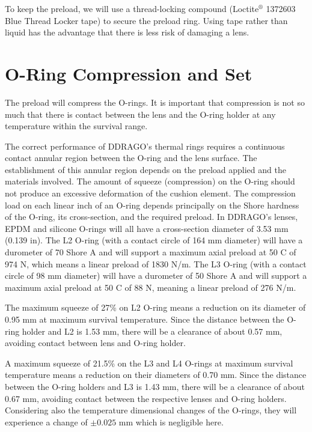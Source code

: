 \documentclass{report}
\begin{document}
To keep the preload, we will use a thread-locking compound (Loctite${}^\circledR $ 1372603 Blue Thread Locker tape) to secure the preload ring. Using tape rather than liquid has the advantage that there is less risk of damaging a lens.

\section{O-Ring Compression and Set}

The preload will compress the O-rings. It is important that compression is not so much that there is contact between the lens and the O-ring holder at any temperature within the survival range.

The correct performance of DDRAGO’s thermal rings requires a continuous contact annular region between the O-ring and the lens surface. The establishment of this annular region depends on the preload applied and the materials involved. The amount of squeeze (compression) on the O-ring should not produce an excessive deformation of the cushion element. The compression load on each linear inch of an O-ring depends principally on the Shore hardness of the O-ring, its cross-section, and the required preload. In DDRAGO’s lenses, EPDM and silicone O-rings will all have a cross-section diameter of 3.53 mm (0.139 in). The L2 O-ring (with a contact circle of 164 mm diameter) will have a durometer of 70 Shore A and will support a maximum axial preload at 50 C of 974 N, which means a linear preload of 1830 N/m. The L3 O-ring (with a contact circle of 98 mm diameter) will have a durometer of 50 Shore A and will support a maximum axial preload at 50 C of 88 N, meaning a linear preload of 276 N/m.

The maximum squeeze of 27\% on L2 O-ring means a reduction on its diameter of 0.95 mm at maximum survival temperature. Since the distance between the O-ring holder and L2 is 1.53 mm, there will be a clearance of about 0.57 mm, avoiding contact between lens and O-ring holder.

A maximum squeeze of 21.5\% on the L3 and L4 O-rings at maximum survival temperature means a reduction on their diameters of 0.70 mm. Since the distance between the O-ring holders and L3 is 1.43 mm, there will be a clearance of about 0.67 mm, avoiding contact between the respective lenses and O-ring holders. Considering also the temperature dimensional changes of the O-rings, they will experience a change of $\pm 0.025$ mm which is negligible here.
\end{document}
